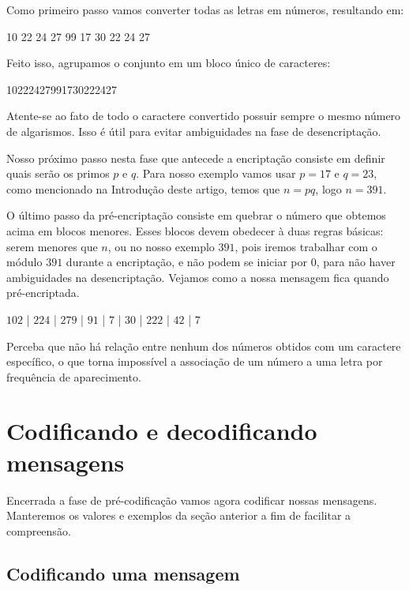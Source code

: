 Como primeiro passo vamos converter todas as letras em n\'umeros, resultando em:
 
\begin{center}
10 22 24 27 99 17 30 22 24 27
\end{center}

Feito isso, agrupamos o conjunto em um bloco \'unico de caracteres:

\begin{center}
10222427991730222427
\end{center}

Atente-se ao fato de todo o caractere convertido possuir sempre o mesmo n\'umero de algarismos. Isso \'e \'util para evitar ambiguidades na fase de desencripta\c{c}\~ao.

Nosso pr\'oximo passo nesta fase que antecede a encripta\c{c}\~ao consiste em definir quais ser\~ao os primos $p$ e $q$. Para nosso exemplo vamos usar $p=17$ e $q=23$, como mencionado na Introdu\c{c}\~ao deste artigo, temos que $n = pq$, logo $n=391$.

O \'ultimo passo da pr\'e-encripta\c{c}\~ao consiste em quebrar o n\'umero que obtemos acima em blocos menores. Esses blocos devem obedecer \`a duas regras b\'asicas: serem menores que $n$, ou no nosso exemplo $391$, pois iremos trabalhar com  o m\'odulo $391$ durante a encripta\c{c}\~ao, e n\~ao podem se iniciar por $0$, para n\~ao haver ambiguidades na desencripta\c{c}\~ao. Vejamos como a nossa mensagem fica quando pr\'e-encriptada.

\begin{center}
$102$ | $224$ | $279$ | $91$ | $7$ | $30$ | $222$ | $42$ | $7$
\end{center}

Perceba que n\~ao h\'a rela\c{c}\~ao entre nenhum dos n\'umeros obtidos com um caractere espec\'ifico, o que torna imposs\'ivel a associa\c{c}\~ao de um n\'umero a uma letra por frequ\^encia de aparecimento. 

\section{Codificando e decodificando mensagens}

Encerrada a fase de pr\'e-codifica\c{c}\~ao vamos agora codificar nossas mensagens. Manteremos os valores e exemplos da se\c{c}\~ao anterior a fim de facilitar a compreens\~ao.

\subsection{Codificando uma mensagem}

